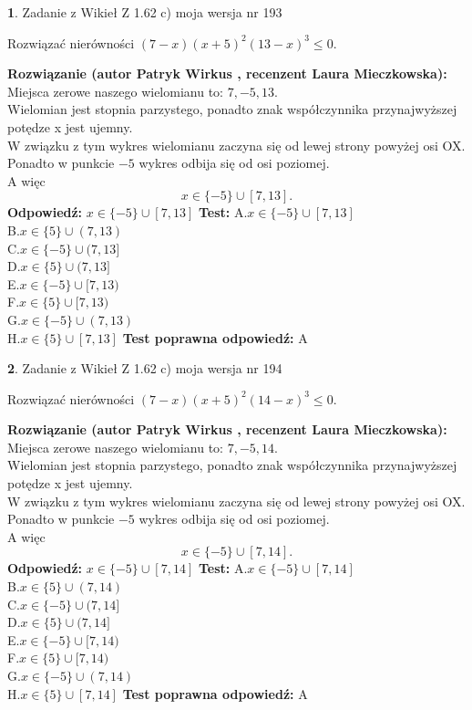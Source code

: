 \documentclass[12pt, a4paper]{article}
\theoremstyle{definition} %
\newtheorem{zad}{}
\newcommand{\zadStart}[1]{\begin{zad}#1\newline}
\newcommand{\zadStop}{\end{zad}}
\newcommand{\rozwStart}[2]{\noindent \textbf{Rozwiązanie (autor #1 , recenzent #2): }\newline}
\newcommand{\rozwStop}{\newline}
\newcommand{\odpStart}{\noindent \textbf{Odpowiedź:}\newline}
\newcommand{\odpStop}{\newline}
\newcommand{\testStart}{\noindent \textbf{Test:}\newline}
\newcommand{\testStop}{\newline}
\newcommand{\kluczStart}{\noindent \textbf{Test poprawna odpowiedź:}\newline}
\newcommand{\kluczStop}{\newline}
\begin{document}
\zadStart{Zadanie z Wikieł Z 1.62 c) moja wersja nr 193}

Rozwiązać nierówności $(7-x)(x+5)^{2}(13-x)^{3}\le0$.
\zadStop
\rozwStart{Patryk Wirkus}{Laura Mieczkowska}
Miejsca zerowe naszego wielomianu to: $7, -5, 13$.\\
Wielomian jest stopnia parzystego, ponadto znak współczynnika przy\linebreak najwyższej potędze x jest ujemny.\\ W związku z tym wykres wielomianu zaczyna się od lewej strony powyżej osi OX.\\
Ponadto w punkcie $-5$ wykres odbija się od osi poziomej.\\
A więc $$x \in \{-5\} \cup [7,13].$$
\rozwStop
\odpStart
$x \in \{-5\} \cup [7,13]$
\odpStop
\testStart
A.$x \in \{-5\} \cup [7,13]$\\
B.$x \in \{5\} \cup (7,13)$\\
C.$x \in \{-5\} \cup (7,13]$\\
D.$x \in \{5\} \cup (7,13]$\\
E.$x \in \{-5\} \cup [7,13)$\\
F.$x \in \{5\} \cup [7,13)$\\
G.$x \in \{-5\} \cup (7,13)$\\
H.$x \in \{5\} \cup [7,13]$
\testStop
\kluczStart
A
\kluczStop



\zadStart{Zadanie z Wikieł Z 1.62 c) moja wersja nr 194}

Rozwiązać nierówności $(7-x)(x+5)^{2}(14-x)^{3}\le0$.
\zadStop
\rozwStart{Patryk Wirkus}{Laura Mieczkowska}
Miejsca zerowe naszego wielomianu to: $7, -5, 14$.\\
Wielomian jest stopnia parzystego, ponadto znak współczynnika przy\linebreak najwyższej potędze x jest ujemny.\\ W związku z tym wykres wielomianu zaczyna się od lewej strony powyżej osi OX.\\
Ponadto w punkcie $-5$ wykres odbija się od osi poziomej.\\
A więc $$x \in \{-5\} \cup [7,14].$$
\rozwStop
\odpStart
$x \in \{-5\} \cup [7,14]$
\odpStop
\testStart
A.$x \in \{-5\} \cup [7,14]$\\
B.$x \in \{5\} \cup (7,14)$\\
C.$x \in \{-5\} \cup (7,14]$\\
D.$x \in \{5\} \cup (7,14]$\\
E.$x \in \{-5\} \cup [7,14)$\\
F.$x \in \{5\} \cup [7,14)$\\
G.$x \in \{-5\} \cup (7,14)$\\
H.$x \in \{5\} \cup [7,14]$
\testStop
\kluczStart
A
\kluczStop
\end{document}
